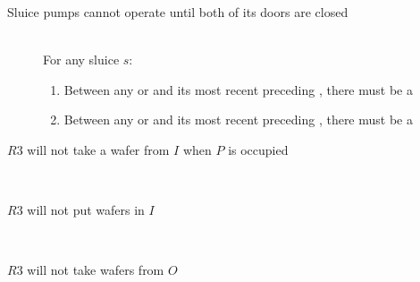 \begin{description}
 \item[Sluice pumps cannot operate until both of its doors are closed] \hfill \\
 For any sluice $s$:
 \begin{enumerate}
  \item Between any  or  and its most recent preceding , there must be a 
  \item Between any  or  and its most recent preceding , there must be a 
 \end{enumerate}

 \item[$R3$ will not take a wafer from $I$ when $P$ is occupied] \hfill \\
 
 \item[$R3$ will not put wafers in $I$] \hfill \\
 
 \item[$R3$ will not take wafers from $O$] \hfill \\
 
\end{description}
